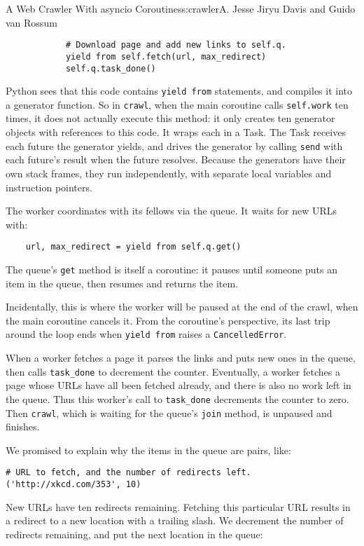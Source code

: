 \begin{aosachapter}{A Web Crawler With asyncio Coroutines}{s:crawler}{A. Jesse Jiryu Davis and Guido van Rossum}
\begin{verbatim}
            # Download page and add new links to self.q.
            yield from self.fetch(url, max_redirect)
            self.q.task_done()
\end{verbatim}

Python sees that this code contains \texttt{yield from} statements, and
compiles it into a generator function. So in \texttt{crawl}, when the
main coroutine calls \texttt{self.work} ten times, it does not actually
execute this method: it only creates ten generator objects with
references to this code. It wraps each in a Task. The Task receives each
future the generator yields, and drives the generator by calling
\texttt{send} with each future's result when the future resolves.
Because the generators have their own stack frames, they run
independently, with separate local variables and instruction pointers.

The worker coordinates with its fellows via the queue. It waits for new
URLs with:

\begin{verbatim}
    url, max_redirect = yield from self.q.get()
\end{verbatim}

The queue's \texttt{get} method is itself a coroutine: it pauses until
someone puts an item in the queue, then resumes and returns the item.

Incidentally, this is where the worker will be paused at the end of the
crawl, when the main coroutine cancels it. From the coroutine's
perspective, its last trip around the loop ends when \texttt{yield from}
raises a \texttt{CancelledError}.

When a worker fetches a page it parses the links and puts new ones in
the queue, then calls \texttt{task\_done} to decrement the counter.
Eventually, a worker fetches a page whose URLs have all been fetched
already, and there is also no work left in the queue. Thus this worker's
call to \texttt{task\_done} decrements the counter to zero. Then
\texttt{crawl}, which is waiting for the queue's \texttt{join} method,
is unpaused and finishes.

We promised to explain why the items in the queue are pairs, like:

\begin{verbatim}
# URL to fetch, and the number of redirects left.
('http://xkcd.com/353', 10)
\end{verbatim}

New URLs have ten redirects remaining. Fetching this particular URL
results in a redirect to a new location with a trailing slash. We
decrement the number of redirects remaining, and put the next location
in the queue:


\end{aosachapter}
